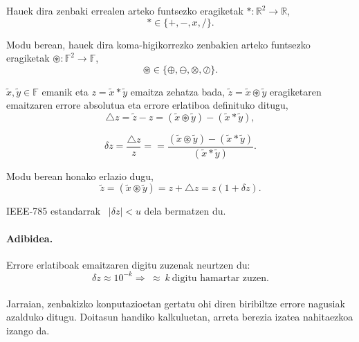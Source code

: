 Hauek dira zenbaki errealen arteko funtsezko eragiketak  $\ast: \mathbb{R}^2\rightarrow \mathbb{R}$, 
\begin{equation*}
\ast\in \{+,-,x,/ \}.
\end{equation*}

Modu berean, hauek dira koma-higikorrezko zenbakien arteko funtsezko eragiketak  $\circledast: \mathbb{F}^2\rightarrow \mathbb{F}$,
\begin{equation*}
\circledast\in \{\oplus,\ominus,\otimes,\oslash \}.
\end{equation*}

$\tilde x,\tilde y \in \mathbb{F}$ emanik eta $z= \tilde x \ast \tilde y$ emaitza zehatza bada, $\tilde z= \tilde x \circledast \tilde y$ eragiketaren emaitzaren errore absolutua eta errore erlatiboa definituko ditugu,
\begin{equation*}
\triangle z=\tilde z-z =(\tilde x \circledast \tilde y) -(\tilde x \ast \tilde y),
\end{equation*} 

\begin{equation*}
\delta z=\frac{\triangle z}{z}==\frac{(\tilde x \circledast \tilde y) -(\tilde x \ast \tilde y)}{(\tilde x \ast \tilde y)}.
\end{equation*} 

Modu berean honako erlazio dugu,
\begin{equation*}
\tilde z=(\tilde x \circledast \tilde y)=z+\triangle z=z(1+\delta z).  
\end{equation*}

IEEE-785 estandarrak \ $|\delta z|<u$ dela bermatzen du.


\paragraph*{\textbf{Adibidea.}}

Errore erlatiboak emaitzaren digitu zuzenak neurtzen du:
\begin{equation*}
\delta z \approx 10^{-k} \Rightarrow \ \approx \ k \ \mbox{digitu hamartar zuzen}.
\end{equation*}  

\paragraph*{} Jarraian, zenbakizko konputazioetan gertatu ohi diren biribiltze errore nagusiak azalduko ditugu. Doitasun handiko kalkuluetan, arreta berezia izatea nahitaezkoa izango da. 

